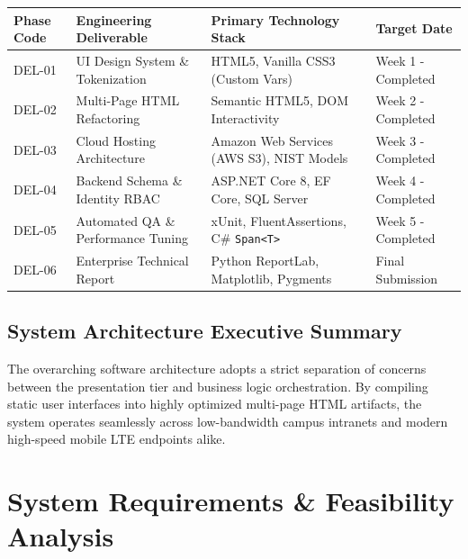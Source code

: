 \documentclass[11pt,a4paper]{report}
\begin{document}
\vspace{10pt}
\noindent
\begin{center}
\renewcommand{\arraystretch}{1.3}
\begin{tabular}{|L{2.2cm}|L{5.0cm}|L{4.8cm}|L{3.5cm}|}
\hline
{}
\textbf{\color{white}Phase Code} & \textbf{\color{white}Engineering Deliverable} & \textbf{\color{white}Primary Technology Stack} & \textbf{\color{white}Target Date} \\
\hline
DEL-01 & UI Design System \& Tokenization & HTML5, Vanilla CSS3 (Custom Vars) & Week 1 - Completed \\
\hline
{}
DEL-02 & Multi-Page HTML Refactoring & Semantic HTML5, DOM Interactivity & Week 2 - Completed \\
\hline
DEL-03 & Cloud Hosting Architecture & Amazon Web Services (AWS S3), NIST Models & Week 3 - Completed \\
\hline
{}
DEL-04 & Backend Schema \& Identity RBAC & ASP.NET Core 8, EF Core, SQL Server & Week 4 - Completed \\
\hline
DEL-05 & Automated QA \& Performance Tuning & xUnit, FluentAssertions, C\# \texttt{Span<T>} & Week 5 - Completed \\
\hline
{}
DEL-06 & Enterprise Technical Report & Python ReportLab, Matplotlib, Pygments & Final Submission \\
\hline
\end{tabular}
\end{center}

\section{System Architecture Executive Summary}
The overarching software architecture adopts a strict separation of concerns between the presentation tier and business logic orchestration. By compiling static user interfaces into highly optimized multi-page HTML artifacts, the system operates seamlessly across low-bandwidth campus intranets and modern high-speed mobile LTE endpoints alike.

\newpage

\chapter{System Requirements \& Feasibility Analysis}
\end{document}
